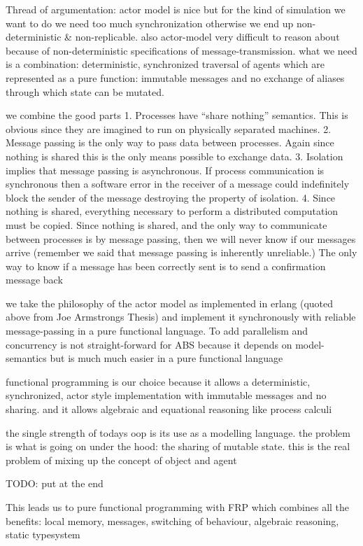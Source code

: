 Thread of argumentation: actor model is nice but for the kind of simulation we want to do we need too much synchronization otherwise we end up non-deterministic \& non-replicable. also actor-model very difficult to reason about because of non-deterministic specifications of message-transmission. what we need is a combination: deterministic, synchronized traversal of agents which are represented as a pure function: immutable messages and no exchange of aliases through which state can be mutated.

we combine the good parts
1. Processes have “share nothing” semantics. This is obvious since they are imagined to run on physically separated machines.
2. Message passing is the only way to pass data between processes. Again since nothing is shared this is the only means possible to exchange data.
3. Isolation implies that message passing is asynchronous. If process communication is synchronous then a software error in the receiver of a message could indefinitely block the sender of the message destroying the property of isolation.
4. Since nothing is shared, everything necessary to perform a distributed computation must be copied. Since nothing is shared, and the only way to communicate between processes is by message passing, then we will never know if our messages arrive (remember we said that message passing is inherently unreliable.) The only way to know if a message has been correctly sent is to send a confirmation message back

we take the philosophy of the actor model as implemented in erlang (quoted above from Joe Armstrongs Thesis) and
implement it synchronously with reliable message-passing in a pure functional language. To add parallelism and concurrency
is not straight-forward for ABS because it depends on model-semantics but is much much easier in a pure functional language

functional programming is our choice because it allows a deterministic, synchronized, actor style  implementation with  immutable messages and no sharing. and it allows algebraic and equational reasoning like process calculi

the single strength of todays oop is its use as a modelling language. the problem is what is going on under the hood: the sharing of mutable state. this is the real problem of mixing up the concept of object and agent

TODO: put at the end


This leads us to pure functional programming with FRP which combines all the benefits: local memory, messages, switching of behaviour, algebraic reasoning, static typesystem

